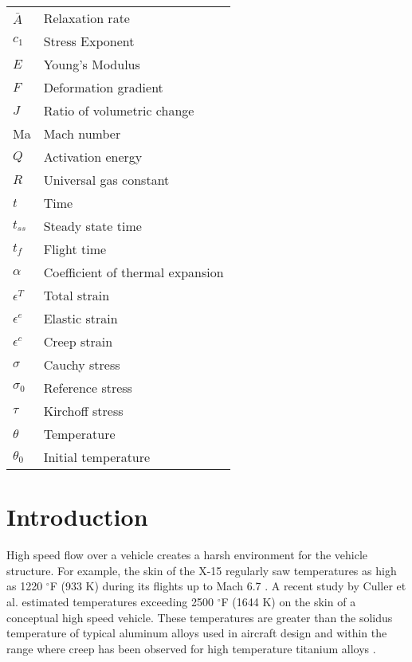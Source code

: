 \documentclass[conf]{new-aiaa}
\begin{document}
{\renewcommand\arraystretch{1.0}
\noindent\begin{longtable*}{@{}l @{\quad=\quad} l@{}}
$\bar{A}$    & Relaxation rate\\
$c_1$        & Stress Exponent\\
$E$          & Young's Modulus \\
$F$          & Deformation gradient\\
$J$          & Ratio of volumetric change\\
Ma           & Mach number\\
$Q$          & Activation energy\\
$R$          & Universal gas constant\\
$t$          & Time\\
$t_{ss}$     & Steady state time\\
$t_{f}$      & Flight time \\
$\alpha$     & Coefficient of thermal expansion\\
$\epsilon^T$ & Total strain\\
$\epsilon^e$ & Elastic strain\\
$\epsilon^c$ & Creep strain\\
$\sigma$     & Cauchy stress\\
$\sigma_0$   & Reference stress\\
$\tau$       & Kirchoff stress\\
$\theta$     & Temperature\\
$\theta_0$   & Initial temperature
\end{longtable*}}

\section{Introduction}

High speed flow over a vehicle creates a harsh environment for 
the vehicle structure.
For example, the skin of the X-15 regularly saw temperatures
as high as 1220 $^{\circ}$F (933 K)
during its flights up to Mach 6.7
\cite{ kordes_structureal_heating_experiencs_on_the_x15_airplane}.
A recent study by Culler et al.
\cite{ culler_impact_of_FTS_coupling_on_response_prediction_hypersonic_skin_panels}
estimated temperatures exceeding 2500 $^\circ$F (1644 K) 
on the skin of a conceptual high speed vehicle.
These temperatures are greater than the solidus 
temperature of typical aluminum alloys used in aircraft design
\cite{ SAE_metals_and_alloys_in_the_unified_numbering_system}
and within the range where creep has been observed for 
high temperature titanium alloys 
\cite{
  evans_effects_of_alpha_case_formation_on_creep_fracture_properties_of_the_high_temperature_titanium_alloy_IMI834,
  lavina_creep_behavior_of_Ti6Al4V_from_450C_to_600C}.
\end{document}

